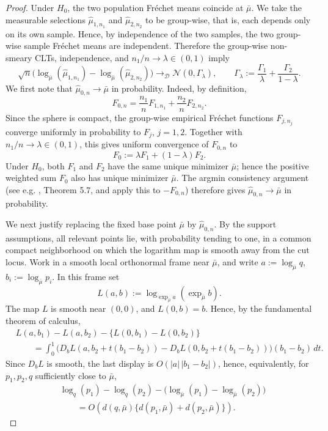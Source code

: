 \documentclass{amsart}
\theoremstyle{definition}
\theoremstyle{remark}
\newcommand\0{\boldsymbol{0}}
\begin{document}
\begin{proof}
Under \(H_0\), the two population Fr\'echet means coincide at \(\bar\mu\).  We take the measurable selections \(\hat\mu_{1,n_1}\) and \(\hat\mu_{2,n_2}\) to be group-wise, that is, each depends only on its own sample.  Hence, by independence of the two samples, the two group-wise sample Fr\'echet means are independent.  Therefore the group-wise non-smeary CLTs, independence, and \(n_1/n\to\lambda\in(0,1)\) imply
\[
\sqrt n\bigl(\log_{\bar\mu}(\hat\mu_{1,n_1})
-
\log_{\bar\mu}(\hat\mu_{2,n_2})\bigr)
\rightarrow_{\mathcal D}
\mathcal N(0,\Gamma_\lambda),
\qquad
\Gamma_\lambda:=\frac{\Gamma_1}{\lambda}+\frac{\Gamma_2}{1-\lambda}.
\]
We first note that \(\hat\mu_{0,n}\to\bar\mu\) in probability.  Indeed, by definition,
\[
F_{0,n}=\frac{n_1}{n}F_{1,n_1}+\frac{n_2}{n}F_{2,n_2}.
\]
Since the sphere is compact, the group-wise empirical Fr\'echet functions \(F_{j,n_j}\) converge uniformly in probability to \(F_j\), \(j=1,2\).  Together with \(n_1/n\to\lambda\in(0,1)\), this gives uniform convergence of \(F_{0,n}\) to
\[
F_0:=\lambda F_1+(1-\lambda)F_2.
\]
Under \(H_0\), both \(F_1\) and \(F_2\) have the same unique minimizer \(\bar\mu\); hence the positive weighted sum \(F_0\) also has unique minimizer \(\bar\mu\).  The argmin consistency argument (see e.g.  \citet{vanderVaart1998}, Theorem 5.7, and apply this to $-F_{0,n}$) therefore gives \(\hat\mu_{0,n}\to\bar\mu\) in probability.

We next justify replacing the fixed base point \(\bar\mu\) by \(\hat\mu_{0,n}\).  By the support assumptions, all relevant points lie, with probability tending to one, in a common compact neighborhood on which the logarithm map is smooth away from the cut locus.  Work in a smooth local orthonormal frame near \(\bar\mu\), and write
\(a:=\log_{\bar\mu}q\), \(b_i:=\log_{\bar\mu}p_i\).  In this frame set
\[
L(a,b):=\log_{\exp_{\bar\mu}a}(\exp_{\bar\mu}b).
\]
The map \(L\) is smooth near \((0,0)\), and \(L(0,b)=b\).  Hence, by the fundamental theorem of calculus,
\[
\begin{aligned}
&L(a,b_1)-L(a,b_2)-\{L(0,b_1)-L(0,b_2)\} \\
&\qquad =
\int_0^1
\bigl(D_bL(a,b_2+t(b_1-b_2))-D_bL(0,b_2+t(b_1-b_2))\bigr)(b_1-b_2)\,dt .
\end{aligned}
\]
Since \(D_bL\) is smooth, the last display is
\(O(|a|\,|b_1-b_2|)\), hence, equivalently, for \(p_1,p_2,q\) sufficiently close to \(\bar\mu\),
\[
\begin{aligned}
&\log_q(p_1)-\log_q(p_2)
-
\bigl(\log_{\bar\mu}(p_1)-\log_{\bar\mu}(p_2)\bigr)
\\
&\qquad =
O\!\left(
d(q,\bar\mu)\{d(p_1,\bar\mu)+d(p_2,\bar\mu)\}
\right).
\end{aligned}
\]



\end{proof}
\end{document}
